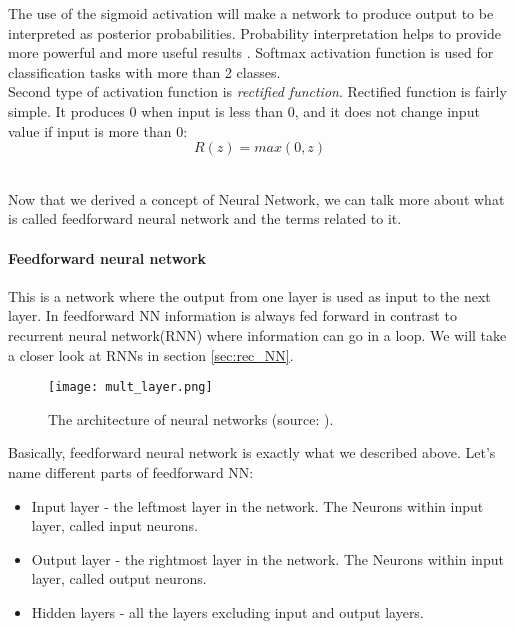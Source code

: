 The use of the sigmoid activation will make a network to produce output to be
interpreted as posterior probabilities. Probability interpretation helps to provide
more powerful and more useful results \cite{Bishop1995}. Softmax activation function
is used for classification tasks with more than 2 classes.
\\
Second type of activation function is \emph{rectified function}.
Rectified function is fairly simple.
It produces $0$ when input is less than $0$, and it does not change input value if
input is more than 0:
\begin{equation} \label{eq:rect_function}
	R(z) = max(0, z)
\end{equation}

\\


Now that we derived a concept of Neural Network, we can talk more about
what is called feedforward neural network and the terms related to it.
\paragraph{Feedforward neural network} This is a network where the output
from one layer is used as input to the next layer. In feedforward \gls{NN}
information is always fed forward in contrast to recurrent neural network(\gls{RNN})
where information can go in a loop. We will take a closer look at RNNs in section
\autoref{sec:rec_NN}.

\begin{figure}[H]
	\texttt{[image: mult\_layer.png]}
	\caption{The architecture of neural networks (source: \cite{Nielsen2015}).} %
	\label{img:mult_layer} %
\end{figure}

Basically, feedforward neural network is exactly
what we described above. Let's name different parts of feedforward \gls{NN}:

\begin{itemize}
	\item Input layer - the leftmost layer in the network. The Neurons within
		input layer, called input neurons.
	\item Output layer - the rightmost layer in the network. The Neurons within
		input layer, called output neurons.
	\item Hidden layers - all the layers excluding input and output layers.
\end{itemize}

